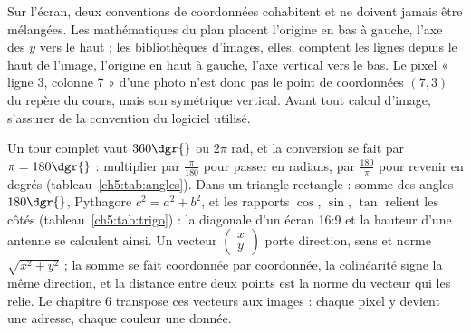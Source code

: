 \begin{attention}
Sur l'écran, deux conventions de coordonnées cohabitent et ne doivent jamais être mélangées. Les mathématiques du plan placent l'origine en bas à gauche, l'axe des $y$ vers le haut ; les bibliothèques d'images, elles, comptent les lignes depuis le haut de l'image, l'origine en haut à gauche, l'axe vertical vers le bas. Le pixel « ligne 3, colonne 7 » d'une photo n'est donc pas le point de coordonnées $(7, 3)$ du repère du cours, mais son symétrique vertical. Avant tout calcul d'image, s'assurer de la convention du logiciel utilisé.
\end{attention}

\begin{aretirer}
Un tour complet vaut $360\dgr{}$ ou $2\pi$ rad, et la conversion se fait par $\pi = 180\dgr{}$ : multiplier par $\frac{\pi}{180}$ pour passer en radians, par $\frac{180}{\pi}$ pour revenir en degrés (tableau~\ref{ch5:tab:angles}). Dans un triangle rectangle : somme des angles $180\dgr{}$, Pythagore $c^{2} = a^{2} + b^{2}$, et les rapports $\cos$, $\sin$, $\tan$ relient les côtés (tableau~\ref{ch5:tab:trigo}) : la diagonale d'un écran 16:9 et la hauteur d'une antenne se calculent ainsi. Un vecteur $\begin{pmatrix} x \\ y \end{pmatrix}$ porte direction, sens et norme $\sqrt{x^{2}+y^{2}}$ ; la somme se fait coordonnée par coordonnée, la colinéarité signe la même direction, et la distance entre deux points est la norme du vecteur qui les relie. Le chapitre 6 transpose ces vecteurs aux images : chaque pixel y devient une adresse, chaque couleur une donnée.
\end{aretirer}
